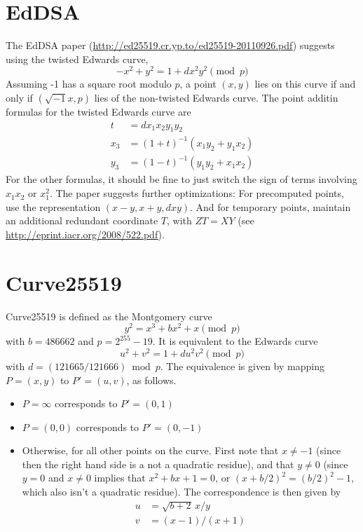\documentclass[a4paper]{article}
\begin{document}
\section{EdDSA}

The EdDSA paper (\url{http://ed25519.cr.yp.to/ed25519-20110926.pdf})
suggests using the twisted Edwards curve,
\begin{equation*}
  -x^2 + y^2 = 1 + d x^2 y^2 \pmod{p}
\end{equation*}
Assuming -1 has a square root modulo $p$, a point $(x, y)$ lies on
this curve if and only if $(\sqrt{-1} x, p)$ lies of the non-twisted
Edwards curve. The point additin formulas for the twisted Edwards
curve are
\begin{align*}
  t &= d x_1 x_2 y_1 y_2 \\
  x_3 &= (1 + t)^{-1} (x_1 y_2 + y_1 x_2) \\
  y_3 &= (1 - t)^{-1} (y_1 y_2 + x_1 x_2)
\end{align*}
For the other formulas, it should be fine to just switch the sign of
terms involving $x_1 x_2$ or $x_1^2$. The paper suggests further
optimizations: For precomputed points, use the representation $(x-y,
x+y, dxy)$. And for temporary points, maintain an additional redundant
coordinate $T$, with $Z T = X Y$ (see
\url{http://eprint.iacr.org/2008/522.pdf}).

\section{Curve25519}

Curve25519 is defined as the Montgomery curve
\begin{equation*}
  y^2 = x^3 + b x^2 + x \pmod p
\end{equation*}
with $b = 486662$ and $p = 2^{255} -19$. It is equivalent to the
Edwards curve
\begin{equation*}
  u^2 + v^2 = 1 + d u^2 v^2 \pmod p
\end{equation*}
with $d = (121665/121666) \bmod p$. The equivalence is given by
mapping $P = (x,y)$ to $P' = (u, v)$, as follows.
\begin{itemize}
\item $P = \infty$ corresponds to $P' = (0, 1)$
\item $P = (0, 0)$ corresponds to $P' = (0, -1)$
\item Otherwise, for all other points on the curve. First note that $x
  \neq -1$ (since then the right hand side is a not a quadratic
  residue), and that $y \neq 0$ (since $y = 0$ and $x \neq 0$ implies
  that $x^2 + bx + 1 = 0$, or $(x + b/2)^2 = (b/2)^2 - 1$, which also
  isn't a quadratic residue). The correspondence is then given by
  \begin{align*}
    u &= \sqrt{b+2} \, x / y \\
    v &= (x-1) / (x+1)
  \end{align*}
\end{itemize}
\end{document}
